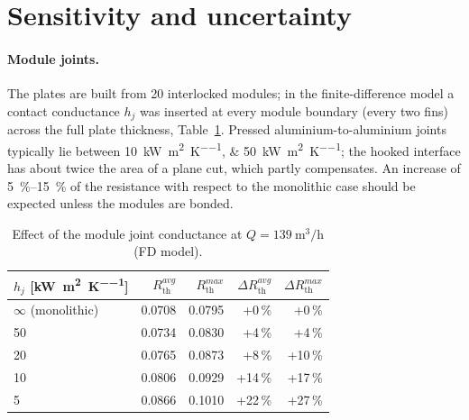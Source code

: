 \documentclass[11pt,a4paper]{article}
\newcommand{\Rth}{R_{\mathrm{th}}}
\begin{document}
\section{Sensitivity and uncertainty}\label{sec:sens}

\paragraph{Module joints.} The plates are built from 20 interlocked modules; in the finite-difference model a contact conductance $h_j$ was inserted at every module boundary (every two fins) across the full plate thickness, Table~\ref{tab:joint}. Pressed aluminium-to-aluminium joints typically lie between \SIlist{10;50}{\kilo\watt\per\metre\squared\per\kelvin}; the hooked interface has about twice the area of a plane cut, which partly compensates. An increase of \SIrange{5}{15}{\percent} of the resistance with respect to the monolithic case should be expected unless the modules are bonded.

\begin{table}[htbp]
\centering\small
\caption{Effect of the module joint conductance at $Q=\SI{139}{\cubic\metre\per\hour}$ (FD model).}
\label{tab:joint}
\begin{tabular}{lrrrr}
\toprule
$h_j$ [\si{\kilo\watt\per\metre\squared\per\kelvin}] & $\Rth^{avg}$ & $\Rth^{max}$ & $\Delta\Rth^{avg}$ & $\Delta\Rth^{max}$ \\
\midrule
$\infty$ (monolithic) & 0.0708 & 0.0795 & +0\,\% & +0\,\% \\
50 & 0.0734 & 0.0830 & +4\,\% & +4\,\% \\
20 & 0.0765 & 0.0873 & +8\,\% & +10\,\% \\
10 & 0.0806 & 0.0929 & +14\,\% & +17\,\% \\
5 & 0.0866 & 0.1010 & +22\,\% & +27\,\% \\
\bottomrule
\end{tabular}
\end{table}
\end{document}
